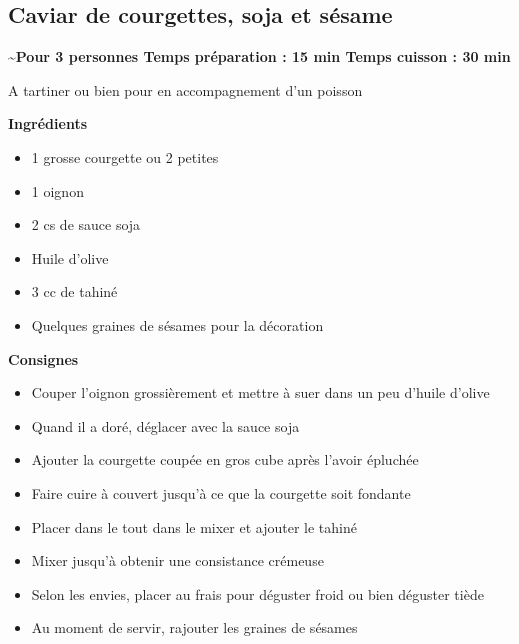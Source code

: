\documentclass[]{book}
\providecommand{\tightlist}{%
  \setlength{\itemsep}{0pt}\setlength{\parskip}{0pt}}
\begin{document}
\hypertarget{caviar-de-courgettes-soja-et-suxe9same}{%
\subsection*{\texorpdfstring{{Caviar de courgettes, soja et sésame}}{Caviar de courgettes, soja et sésame}}\label{caviar-de-courgettes-soja-et-suxe9same}}

\begin{salebox}
\textbf{\textasciitilde{}Pour 3 personnes \textbar{} Temps préparation :
15 min \textbar{} Temps cuisson : 30 min}

A tartiner ou bien pour en accompagnement d'un poisson
\end{salebox}

\textbf{Ingrédients}

\begin{itemize}
\tightlist
\item
  1 grosse courgette ou 2 petites
\item
  1 oignon
\item
  2 cs de sauce soja
\item
  Huile d'olive
\item
  3 cc de tahiné
\item
  Quelques graines de sésames pour la décoration
\end{itemize}

\textbf{Consignes}

\begin{itemize}
\tightlist
\item
  Couper l'oignon grossièrement et mettre à suer dans un peu d'huile d'olive
\item
  Quand il a doré, déglacer avec la sauce soja
\item
  Ajouter la courgette coupée en gros cube après l'avoir épluchée\\
\item
  Faire cuire à couvert jusqu'à ce que la courgette soit fondante
\item
  Placer dans le tout dans le mixer et ajouter le tahiné
\item
  Mixer jusqu'à obtenir une consistance crémeuse
\item
  Selon les envies, placer au frais pour déguster froid ou bien déguster tiède
\item
  Au moment de servir, rajouter les graines de sésames
\end{itemize}
\end{document}
